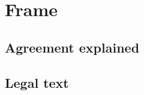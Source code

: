 %
%
%
\part{Frame}\label{frame}
\chapter{Agreement explained}\label{frame_explained}
\chapter{Legal text}\label{frame_legal_text}
